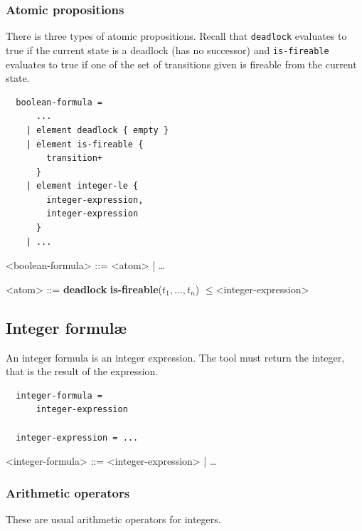 \documentclass[10pt,english,a4paper]{article}
\newcommand\atomleq          {\boldmath$\leq$\xspace}
\newcommand\atomdead         {\textbf{deadlock}\xspace}
\newcommand\atomisfire[1]    {\textbf{is-fireable}(#1)}
\begin{document}
\subsubsection{Atomic propositions}

There is three types of atomic propositions.
Recall that
\lstinline!deadlock! evaluates to true if the current state is a deadlock
(has no successor) and
\lstinline!is-fireable! evaluates to true if one of the set of transitions
given is fireable from the current state.

\begin{multicols}{2}
\begin{lstlisting}
  boolean-formula =
      ...
    | element deadlock { empty }
    | element is-fireable {
        transition+
      }
    | element integer-le {
        integer-expression,
        integer-expression
      }
    | ...
\end{lstlisting}
\columnbreak
\setlength{\grammarindent}{6em}
\begin{grammar}
<boolean-formula> ::= <atom> | \ldots

<atom> ::= \atomdead
\alt \atomisfire{$t_1, \ldots, t_n$}
 \atomleq <integer-expression>
\end{grammar}
\end{multicols}


\subsection{Integer formul{\ae}}

An integer formula is an integer expression.
The tool must return the integer, that is the result of the expression.

\begin{multicols}{2}
\begin{lstlisting}
  integer-formula =
      integer-expression

  integer-expression = ...
\end{lstlisting}
\columnbreak
\begin{grammar}
<integer-formula> ::= <integer-expression> | \ldots
\end{grammar}
\end{multicols}

\subsubsection{Arithmetic operators}

These are usual arithmetic operators for integers.
\end{document}
